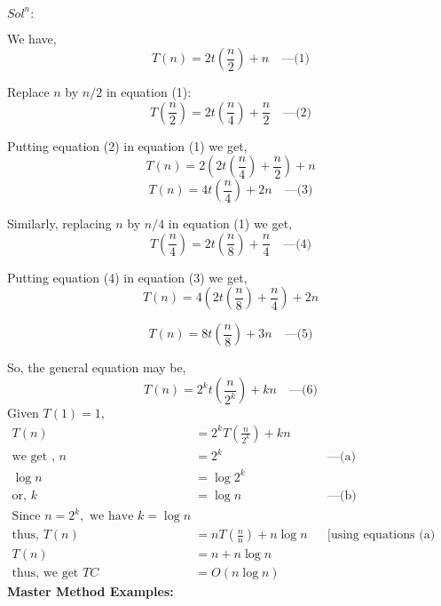 \documentclass{article}
\begin{document}
$Sol^n:$

We have,
\begin{equation}
    T(n) = 2t\left(\frac{n}{2}\right) + n \quad \text{---(1)}
\end{equation}

Replace \( n \) by \( n/2 \) in equation (1):
\begin{equation}
    T\left(\frac{n}{2}\right) = 2t\left(\frac{n}{4}\right) + \frac{n}{2} \quad \text{---(2)}
\end{equation}

Putting equation (2) in equation (1) we get,
\begin{equation}
    T(n) = 2\left(2t\left(\frac{n}{4}\right) + \frac{n}{2}\right) + n
\end{equation}
\begin{equation}
    T(n) = 4t\left(\frac{n}{4}\right) + 2n \quad \text{---(3)}
\end{equation}

Similarly, replacing \( n \) by \( n/4 \) in equation (1) we get,
\begin{equation}
    T\left(\frac{n}{4}\right) = 2t\left(\frac{n}{8}\right) + \frac{n}{4} \quad \text{---(4)}
\end{equation}

Putting equation (4) in equation (3) we get,
\begin{equation}
T(n) = 4(2t\left(\frac{n}{8}\right) + \frac{n}{4}) + 2n
\end{equation}

\begin{equation}
    T(n) = 8t\left(\frac{n}{8}\right) + 3n \quad \text{---(5)}
\end{equation}


So, the general equation may be,
\begin{equation}
    T(n) = 2^k t\left(\frac{n}{2^k}\right) + kn \quad \text{---(6)}
\end{equation}
Given \( T(1) = 1 \),
\begin{align*}
    T(n) & = 2^k T\left(\frac{n}{2^k}\right) + kn \\\text{we get , }
    n & = 2^k && \text{---(a)} \\
    \log n & = \log 2^k \\
    \text{or, } k & = \log n && \text{---(b)} \\
    \text{Since } n = 2^k, \text{ we have } k = \log n \\
    \text{thus, } T(n) & = nT\left(\frac{n}{n}\right) + n \log n && \text{[using equations (a) and (b)]} \\
    T(n) & = n + n\log n\\
\text{thus, we get }    TC &= O(n \log n)
\end{align*}
\hrulefill
\newpage
\textbf{Master Method Examples:}
\vspace*{10pt}
\end{document}
